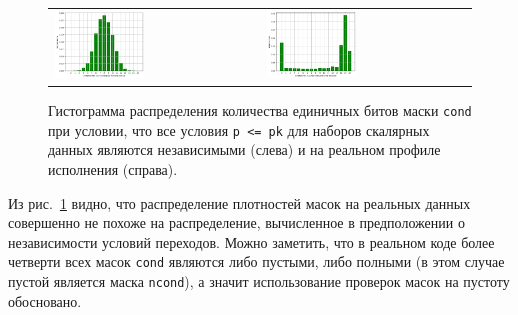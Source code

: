 \begin{figure}[ht]
\centering
\begin{tabular}{ll}
\includegraphics[width=0.45\textwidth]{fig/vec_mask_distr_independent_p.png}
&
\includegraphics[width=0.45\textwidth]{fig/vec_mask_distr_real_p.png}
\end{tabular}
\singlespacing
{}\caption{Гистограмма распределения количества единичных битов маски \texttt{cond} при условии, что все условия \texttt{p <= pk} для наборов скалярных данных являются независимыми (слева) и на реальном профиле исполнения (справа).}
\label{fig:text_4_vec_comb_mask_independent_p}
\end{figure}

Из рис.~\ref{fig:text_4_vec_comb_mask_independent_p} видно, что распределение плотностей масок на реальных данных совершенно не похоже на распределение, вычисленное в предположении о независимости условий переходов.
Можно заметить, что в реальном коде более четверти всех масок \texttt{cond} являются либо пустыми, либо полными (в этом случае пустой является маска \texttt{ncond}), а значит использование проверок масок на пустоту обосновано.

